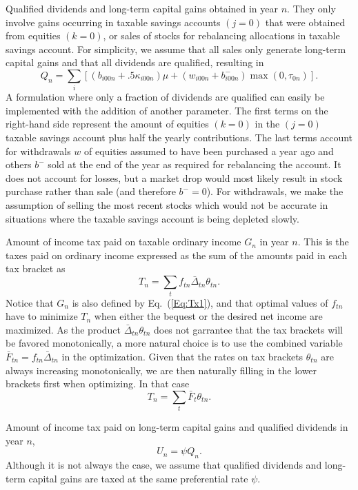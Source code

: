\documentclass{article}[fleqn,12pt]
\begin{document}
\begin{description}[leftmargin=4em,style=multiline]
\item [$Q_n$]
	Qualified dividends and long-term capital gains obtained in year $n$.
	They only involve gains occurring in taxable savings accounts $(j=0)$ that
	were obtained from equities $(k=0)$, or sales of stocks for rebalancing allocations
	in taxable savings account.
	For simplicity, we assume that all sales only generate long-term capital gains and
	that all dividends are qualified, resulting in
	\begin{equation}
		\label{Eq:Qx2}
		Q_n = \sum_{i} \left[(b_{i00n} + .5\kappa_{i00n})\mu +
		(w_{i00n} + b^-_{i00n}){\max(0, \tau_{0n})}\right].
	\end{equation}
	A formulation where only a fraction of dividends are qualified can easily be
	implemented with the addition of another parameter.
	The first terms on the right-hand side represent the amount of equities $(k=0)$ in the $(j=0)$
	taxable savings account plus
	half the yearly contributions. The last terms account for withdrawals $w$ of equities assumed
	to have been purchased a year ago and others $b^-$ sold at the end
	of the year as required for rebalancing the account. It does not account for losses, but a market drop
	would most likely result in stock purchase rather than sale (and therefore $b^- = 0$).
	For withdrawals, we make the assumption of
	selling the most recent stocks which would not be accurate in situations where
	the taxable savings account is being depleted slowly.
\item [$T_n$]
	Amount of income tax paid on taxable ordinary income $G_n$ in year $n$.
	This is the taxes paid on ordinary income expressed as the sum of the amounts
	paid in each tax bracket as
	\begin{equation}
		\label{Eq:Tax}
		T_n = \sum_t f_{tn}\bar{\Delta}_{tn}\theta_{tn}.
	\end{equation}
	Notice that $G_n$ is also defined by Eq.~(\ref{Eq:Tx1}), and that optimal
	values of $f_{tn}$ have to
	minimize $T_n$ when either the bequest or the desired net income are maximized.
	As the product $\bar{\Delta}_{tn}\theta_{tn}$ does not garrantee that the tax brackets
	will be favored monotonically, a more natural choice is to use the combined variable
	$\bar{F}_{tn} = f_{tn}\bar{\Delta}_{tn}$ in the optimization. Given that the rates on
	tax brackets $\theta_{tn}$ are always increasing monotonically, we are then naturally
	filling in the lower brackets first when optimizing. In that case
		\begin{equation}
			T_n = \sum_t \bar{F}_t \theta_{tn}.
		\end{equation}
\item [$U_n$]
	Amount of income tax paid on long-term capital gains and qualified dividends in year $n$,
	\begin{equation}
		U_n = \psi Q_n.
	\end{equation}
	Although it is not always the case, we assume that qualified dividends and long-term
	capital gains are taxed at the same preferential rate $\psi$.
\end{description}
\end{document}
